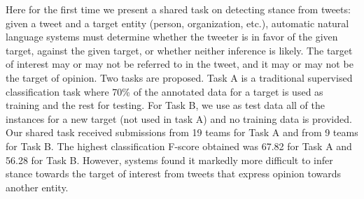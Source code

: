 Here for the first time we present a shared task on detecting stance from tweets: given a tweet and a target entity (person, organization, etc.), automatic natural language systems must determine whether the tweeter is in favor of the given target, against the given target, or whether neither inference is likely. The target of interest may or may not be referred to in the tweet, and it may or may not be the target of opinion. Two tasks are proposed. Task A is a traditional supervised classification task where 70\% of the annotated data for a target is used as training and the rest for testing. For Task B, we use as test data all of the instances for a new target (not used in task A) and no training data is provided. Our shared task received submissions from 19 teams for Task A and from 9 teams for Task B. The highest classification F-score obtained was 67.82 for Task A and 56.28 for Task B. However, systems found it markedly more difficult to infer stance towards the target of interest from tweets that express opinion towards another entity.
